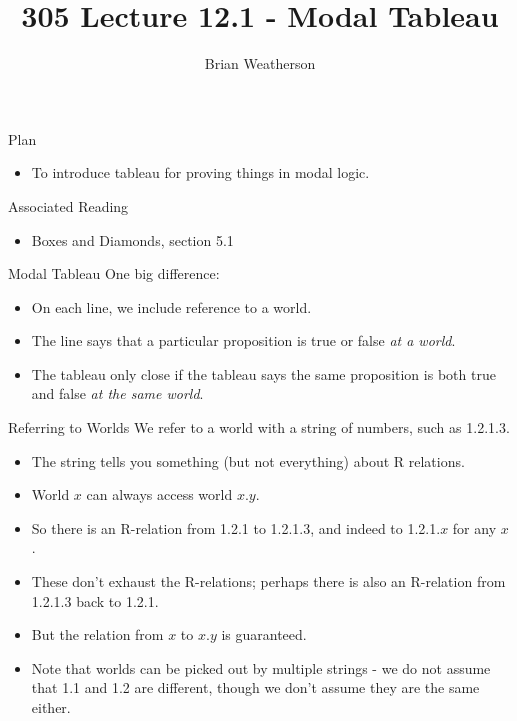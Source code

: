 \documentclass[
  ignorenonframetext,
]{beamer}
\title{305 Lecture 12.1 - Modal Tableau}
\author{Brian Weatherson}
\date{}
\providecommand{\tightlist}{%
  \setlength{\itemsep}{0pt}\setlength{\parskip}{0pt}}
\renewcommand{\,}{\text{, }}
\begin{document}
\frame{\titlepage}

\begin{frame}{Plan}
\protect\hypertarget{plan}{}
\begin{itemize}
\tightlist
\item
  To introduce tableau for proving things in modal logic.
\end{itemize}
\end{frame}

\begin{frame}{Associated Reading}
\protect\hypertarget{associated-reading}{}
\begin{itemize}
\tightlist
\item
  Boxes and Diamonds, section 5.1
\end{itemize}
\end{frame}

\begin{frame}{Modal Tableau}
\protect\hypertarget{modal-tableau}{}
One big difference:

\begin{itemize}
\tightlist
\item
  On each line, we include reference to a world.
\item
  The line says that a particular proposition is true or false \emph{at
  a world}.
\item
  The tableau only close if the tableau says the same proposition is
  both true and false \emph{at the same world}.
\end{itemize}
\end{frame}

\begin{frame}{Referring to Worlds}
\protect\hypertarget{referring-to-worlds}{}
We refer to a world with a string of numbers, such as 1.2.1.3.

\begin{itemize}
\tightlist
\item
  The string tells you something (but not everything) about R relations.
\item
  World \(x\) can always access world \(x.y\).
\item
  So there is an R-relation from 1.2.1 to 1.2.1.3, and indeed to
  1.2.1.\(x\) for any \(x\).
\item
  These don't exhaust the R-relations; perhaps there is also an
  R-relation from 1.2.1.3 back to 1.2.1.
\item
  But the relation from \(x\) to \(x.y\) is guaranteed.
\item
  Note that worlds can be picked out by multiple strings - we do not
  assume that 1.1 and 1.2 are different, though we don't assume they are
  the same either.
\end{itemize}
\end{frame}
\end{document}
